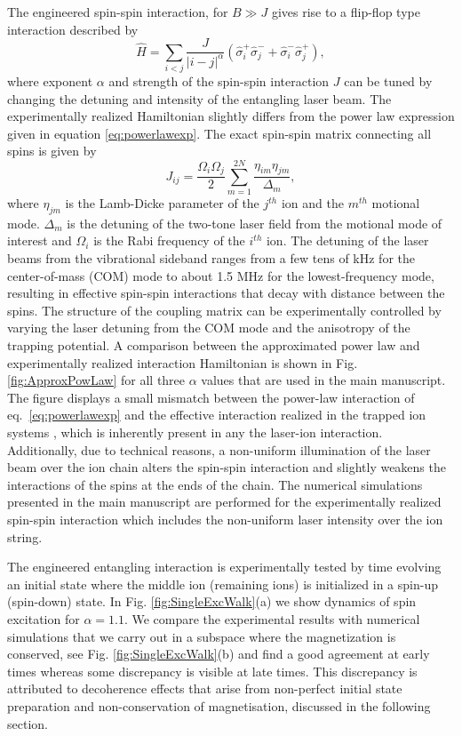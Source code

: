 \documentclass[aps,10pt,reprint,groupedaddress,superscriptaddress]{revtex4-2}
\begin{document}
The engineered spin-spin interaction, for $B \gg J$ gives rise to a flip-flop type interaction described by  
\begin{equation}\label{eq:powerlawexp}
    \hat H= \sum_{i<j} \frac{J}{|i-j|^\alpha} (\hat \sigma^+_i\hat\sigma^-_j + \hat \sigma^-_i\hat\sigma^+_j),
\end{equation}
where exponent $\alpha$ and strength of the spin-spin interaction $J$ can be tuned by changing the detuning and intensity of the entangling laser beam. The experimentally realized Hamiltonian slightly differs from the power law expression given in equation \ref{eq:powerlawexp}. The exact spin-spin matrix connecting all spins is given by
\begin{equation}
    J_{ij}=\frac{\Omega_i \Omega_j}{2}\sum_{m=1}^{2N}\frac{\eta_{im}\eta_{jm}}{\Delta_m},
\end{equation}
where $\eta_{jm}$ is the Lamb-Dicke parameter of the $j^{th}$ ion and the $m^{th}$ motional mode. $\Delta_m$ is the detuning of the two-tone laser field from the motional mode of interest and $\Omega_i$ is the Rabi frequency of the $i^{th}$ ion. 
%
The detuning of the laser beams from the vibrational sideband ranges from a few tens of kHz for the center-of-mass (COM) mode to about 1.5 MHz for the lowest-frequency mode, resulting in effective spin-spin interactions that decay with distance between the spins. The structure of the coupling matrix can be experimentally controlled by varying the laser detuning from the COM mode and the anisotropy of the trapping potential.
%
A comparison between the approximated power law and experimentally realized interaction Hamiltonian is shown in Fig. \ref{fig:ApproxPowLaw} for all three $\alpha$ values that are used in the main manuscript. The figure displays a small mismatch between the power-law interaction of eq.~\ref{eq:powerlawexp} and the effective interaction realized in the trapped ion systems \cite{Nevado_2016}, which is inherently present in any the laser-ion interaction. Additionally, due to technical reasons, a non-uniform illumination of the laser beam  over the ion chain alters the spin-spin interaction and slightly weakens the interactions of the spins at the ends of the chain. The numerical simulations presented in the main manuscript are performed for the experimentally realized spin-spin interaction which includes the non-uniform laser intensity over the ion string. 


The engineered entangling interaction is experimentally tested by time evolving an initial state where the middle ion (remaining ions) is initialized in a spin-up (spin-down) state. In Fig. \ref{fig:SingleExcWalk}(a) we show dynamics of spin excitation for $\alpha =1.1$. We compare the experimental results with numerical simulations that we carry out in a subspace where the magnetization is conserved, see Fig. \ref{fig:SingleExcWalk}(b) and find a good agreement at early times whereas some discrepancy is visible at late times. This discrepancy is attributed to decoherence effects that arise from non-perfect initial state preparation and non-conservation of magnetisation, discussed in the following section. 
\end{document}

